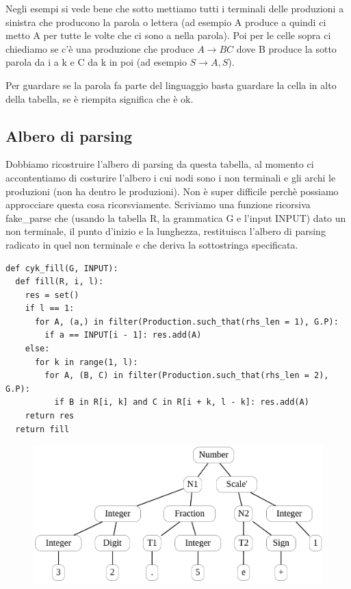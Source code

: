 Negli esempi si vede bene che sotto mettiamo tutti i terminali delle produzioni a sinistra che producono la parola o lettera (ad esempio A produce a quindi ci metto A per tutte le volte che ci sono a nella parola). Poi per le celle sopra ci chiediamo se c'è una produzione che produce $A \rightarrow BC$ dove B produce la sotto parola da i a k e C da k in poi (ad esempio $S \rightarrow A, S$).

Per guardare se la parola fa parte del linguaggio basta guardare la cella in alto della tabella, se è riempita significa che è ok.
\subsection{Albero di parsing}
Dobbiamo ricostruire l'albero di parsing da questa tabella, al momento ci accontentiamo di costurire l'albero i cui nodi sono i non terminali e gli archi le produzioni (non ha dentro le produzioni). Non è super difficile perchè possiamo approcciare questa cosa ricorsviamente.
Scriviamo una funzione ricorsiva fake\_parse che (usando la tabella R, la grammatica G e l'input INPUT) dato un non terminale, il punto d'inizio e la lunghezza, restituisca l'albero di parsing radicato in quel non terminale e che deriva la sottostringa specificata.

\begin{lstlisting}
def cyk_fill(G, INPUT):
  def fill(R, i, l):
    res = set()
    if l == 1:
      for A, (a,) in filter(Production.such_that(rhs_len = 1), G.P): 
        if a == INPUT[i - 1]: res.add(A)
    else:
      for k in range(1, l):
        for A, (B, C) in filter(Production.such_that(rhs_len = 2), G.P):
          if B in R[i, k] and C in R[i + k, l - k]: res.add(A)
    return res
  return fill
\end{lstlisting}

\begin{figure}[ht!]
  \centering
  \includegraphics[scale=1]{images/Parsing/fake_parser.png}
\end{figure}

